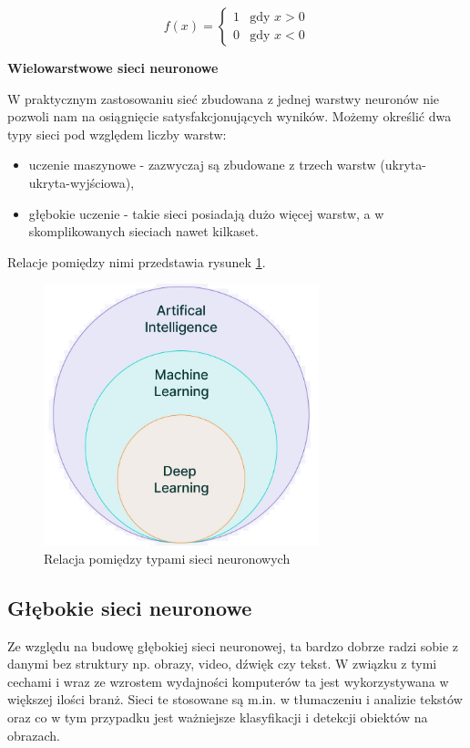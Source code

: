 \begin{equation}
	f(x) = \begin{cases}
		1 & \text{gdy } x > 0 \\ 
		0 & \text{gdy } x < 0 
	\end{cases}
	\label{eq:skokuJednostkowego}
\end{equation}


\textbf{Wielowarstwowe sieci neuronowe}

W praktycznym zastosowaniu sieć zbudowana z jednej warstwy neuronów nie pozwoli nam na osiągnięcie satysfakcjonujących wyników.
Możemy określić dwa typy sieci pod względem liczby warstw: 
\begin{itemize}
	\item uczenie maszynowe - zazwyczaj są zbudowane z trzech warstw (ukryta-ukryta-wyjściowa), 
	\item głębokie uczenie - takie sieci posiadają dużo więcej warstw, a w skomplikowanych sieciach nawet kilkaset.
\end{itemize}

Relacje pomiędzy nimi przedstawia rysunek \ref{rys:schematAI}.
\begin{figure}[H]
	\centering
	\includegraphics[width=8cm]{pages/teoria/zdjecia/schematAI.jpg}
	\caption{Relacja pomiędzy typami sieci neuronowych \cite{schematAISite}}
	\label{rys:schematAI}
\end{figure}
\subsection{Głębokie sieci neuronowe}
Ze względu na budowę głębokiej sieci neuronowej, ta bardzo dobrze radzi sobie z danymi bez struktury np. obrazy, video, dźwięk czy tekst. 
W związku z tymi cechami i wraz ze wzrostem wydajności komputerów ta jest wykorzystywana w większej ilości branż. Sieci te stosowane są 
m.in. w tłumaczeniu i analizie tekstów oraz co w tym przypadku jest ważniejsze klasyfikacji i detekcji obiektów na obrazach.

